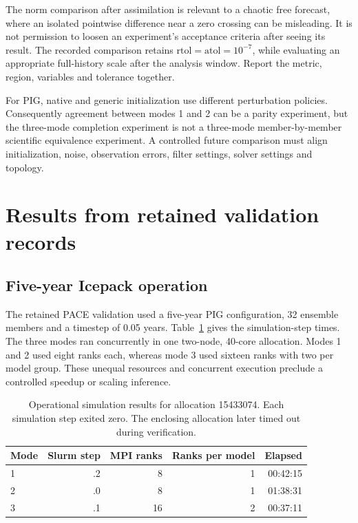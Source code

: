 \documentclass[11pt,a4paper]{article}
\begin{document}
The norm comparison after assimilation is relevant to a chaotic free forecast, where an isolated pointwise difference near a zero crossing can be misleading. It is not permission to loosen an experiment's acceptance criteria after seeing its result. The recorded comparison retains \(\mathrm{rtol}=\mathrm{atol}=10^{-7}\), while evaluating an appropriate full-history scale after the analysis window. Report the metric, region, variables and tolerance together.

For PIG, native and generic initialization use different perturbation policies. Consequently agreement between modes 1 and 2 can be a parity experiment, but the three-mode completion experiment is not a three-mode member-by-member scientific equivalence experiment. A controlled future comparison must align initialization, noise, observation errors, filter settings, solver settings and topology.

\section{Results from retained validation records}
\subsection{Five-year Icepack operation}
The retained PACE validation used a five-year PIG configuration, 32 ensemble members and a timestep of 0.05 years. Table~\ref{tab:runtime} gives the simulation-step times. The three modes ran concurrently in one two-node, 40-core allocation. Modes 1 and 2 used eight ranks each, whereas mode 3 used sixteen ranks with two per model group. These unequal resources and concurrent execution preclude a controlled speedup or scaling inference.

\begin{table}[htbp]\centering
\caption{Operational simulation results for allocation 15433074. Each simulation step exited zero. The enclosing allocation later timed out during verification.}\label{tab:runtime}
\begin{tabular}{lrrrr}\toprule
Mode & Slurm step & MPI ranks & Ranks per model & Elapsed\\\midrule
1 & .2 & 8 & 1 & 00:42:15\\
2 & .0 & 8 & 1 & 01:38:31\\
3 & .1 & 16 & 2 & 00:37:11\\\bottomrule
\end{tabular}
\end{table}
\end{document}
